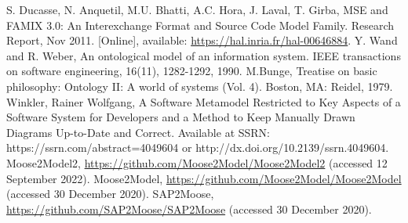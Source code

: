\documentclass[preprint,12pt]{elsarticle}
\begin{document}
\begin{thebibliography}{00}
S. Ducasse, N. Anquetil, M.U. Bhatti, A.C. Hora, J. Laval, T. Girba, MSE and FAMIX 3.0: An Interexchange Format and Source Code Model Family. Research Report, Nov 2011. [Online], available: \url{https://hal.inria.fr/hal-00646884}.
Y. Wand and R. Weber, An ontological model of an information system. IEEE transactions on software engineering, 16(11), 1282-1292, 1990.
M.Bunge, Treatise on basic philosophy: Ontology II: A world of systems (Vol. 4). Boston, MA: Reidel, 1979.
Winkler, Rainer Wolfgang, A Software Metamodel Restricted to Key Aspects of a Software System for Developers and a Method to Keep Manually Drawn Diagrams Up-to-Date and Correct. Available at SSRN: https://ssrn.com/abstract=4049604 or http://dx.doi.org/10.2139/ssrn.4049604.
Moose2Model2, \url{https://github.com/Moose2Model/Moose2Model2} (accessed 12 September 2022).
Moose2Model, \url{https://github.com/Moose2Model/Moose2Model} (accessed 30 December 2020).
SAP2Moose, \url{https://github.com/SAP2Moose/SAP2Moose} (accessed 30 December 2020).

\end{thebibliography}
\end{document}
